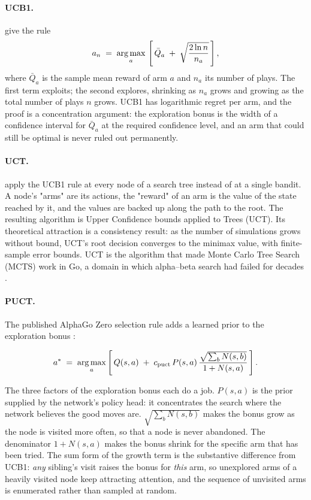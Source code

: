 \paragraph{UCB1.} \citet{auer2002ucb1} give the rule
\begin{equation}
a_n \;=\; \operatorname*{arg\,max}_{a}\,\left[\, \bar{Q}_a \;+\;
\sqrt{\frac{2 \ln n}{n_a}} \,\right],
\label{eq:ucb1}
\end{equation}
where $\bar{Q}_a$ is the sample mean reward of arm $a$ and $n_a$ its number of
plays. The first term exploits; the second explores, shrinking as $n_a$ grows and
growing as the total number of plays $n$ grows. UCB1 has logarithmic regret per
arm, and the proof is a concentration argument: the exploration bonus is the
width of a confidence interval for $\bar{Q}_a$ at the required confidence level,
and an arm that could still be optimal is never ruled out permanently.

\paragraph{UCT.} \citet{kocsis2006uct} apply the UCB1 rule at every node of a
search tree instead of at a single bandit. A node's "arms" are its actions, the
"reward" of an arm is the value of the state reached by it, and the values are
backed up along the path to the root. The resulting algorithm is Upper Confidence
bounds applied to Trees (UCT). Its theoretical attraction is a consistency
result: as the number of simulations grows without bound, UCT's root decision
converges to the minimax value, with finite-sample error bounds. UCT is the
algorithm that made Monte Carlo Tree Search (MCTS) work in Go, a domain in which
alpha--beta search had failed for decades \citep{coulom2006mcts, browne2012survey}.

\paragraph{PUCT.} The published AlphaGo Zero selection rule adds a learned prior
to the exploration bonus \citep{rosin2011puct}:

\begin{equation}
a^{*} \;=\; \operatorname*{arg\,max}_a \left[\, Q(s,a) \;+\; c_{\mathrm{puct}}\,
P(s,a)\, \frac{\sqrt{\sum_b N(s,b)}}{1 + N(s,a)} \,\right].
\label{eq:puct}
\end{equation}

The three factors of the exploration bonus each do a job. $P(s,a)$ is the prior
supplied by the network's policy head: it concentrates the search where the
network believes the good moves are. $\sqrt{\sum_b N(s,b)}$ makes the bonus grow
as the node is visited more often, so that a node is never abandoned. The
denominator $1 + N(s,a)$ makes the bonus shrink for the specific arm that has
been tried. The sum form of the growth term is the substantive difference from
UCB1: \emph{any} sibling's visit raises the bonus for \emph{this} arm, so
unexplored arms of a heavily visited node keep attracting attention, and the
sequence of unvisited arms is enumerated rather than sampled at random.

